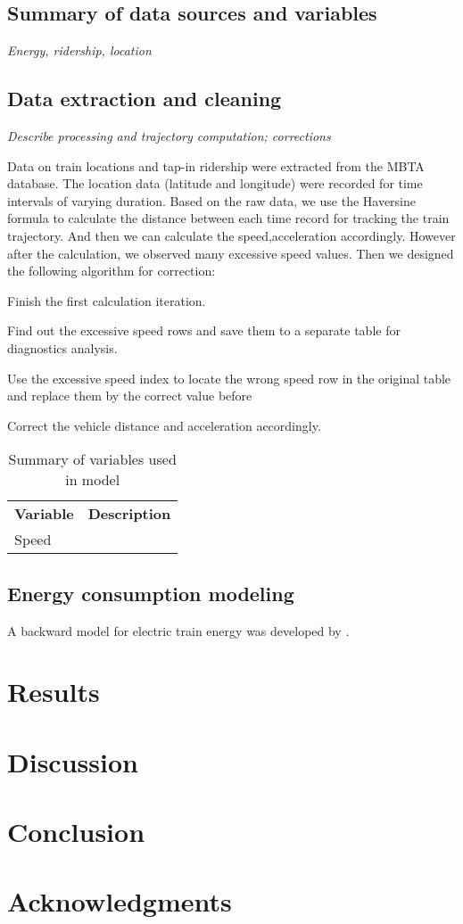 \documentclass[preprint, 11pt]{elsarticle}
\newcommand{\?}{\stackrel{?}{=}}
\begin{document}
\subsection{Summary of data sources and variables}
{\it Energy, ridership, location}

\subsection{Data extraction and cleaning}
{\it Describe processing and trajectory computation; corrections}

Data on train locations and tap-in ridership were extracted from the MBTA database.
The location data (latitude and longitude) were recorded for time intervals of varying duration. Based on the raw data, we use the Haversine formula to calculate the distance between each time record for tracking the train trajectory. And then we can calculate the speed,acceleration accordingly. However after the calculation, we observed many excessive speed values. Then we designed the following algorithm for correction:
\item{Finish the first calculation iteration.}
\item{Find out the excessive speed rows and save them to a separate table for diagnostics analysis.}
\item{Use the excessive speed index to locate the wrong speed row in the original table and replace them by the correct value before}
\item{Correct the vehicle distance and acceleration accordingly.}


\begin{table}[]\footnotesize
    \centering
    \begin{tabular}{l l}\toprule
        \bf Variable & \bf Description \\
       Speed  &  \\\bottomrule
    \end{tabular}
    \caption{Summary of variables used in model}
    \label{tab:my_label}
\end{table}

\subsection{Energy consumption modeling}
A backward model for electric train energy was developed by \cite{wang2017electric}.

\section{Results}

\section{Discussion}

\section{Conclusion}

\section*{Acknowledgments}



\end{document}
